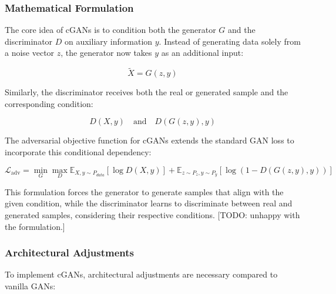 \subsubsection{Mathematical Formulation}
\label{theoretical_cgan_math}
The core idea of cGANs is to condition both the generator \(G\) and the discriminator \(D\) on auxiliary information \(y\). Instead of generating data solely from a noise vector \(z\), the generator now takes \(y\) as an additional input:

\begin{equation}
\tilde{X} = G(z, y)
\end{equation}

\noindent
Similarly, the discriminator receives both the real or generated sample and the corresponding condition:

\begin{equation}
D(X, y) \quad \text{and} \quad D(G(z, y), y)
\end{equation}

\noindent
The adversarial objective function for cGANs extends the standard GAN loss to incorporate this conditional dependency:

\begin{equation}\label{theory_gan_cond_formula}
\mathcal{L}_{\text{adv}} = \min_G \max_D \mathbb{E}_{X, y \sim P_{data}} [\log D(X, y)] + \mathbb{E}_{z \sim P_z, y \sim P_y} [\log (1 - D(G(z, y), y))]
\end{equation}

\noindent
This formulation forces the generator to generate samples that align with the given condition, while the discriminator learns to discriminate between real and generated samples, considering their respective conditions. [TODO: unhappy with the formulation.]

\subsubsection{Architectural Adjustments}
\label{theory_cgan_architecture}
To implement cGANs, architectural adjustments are necessary compared to vanilla GANs:

